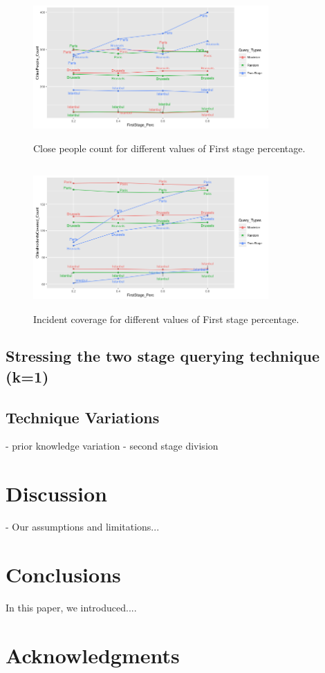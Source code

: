 \documentclass{acm_proc_article-sp}
\begin{document}
\begin{figure}[!h]
\centering
   \includegraphics[width=9cm ,height=5.5cm]{figuresPng/hollaCloseCnt.png}
   \caption{Close people count for different values of First stage percentage. }
   \label{fig: hollaCloseCount}
\end{figure}
\begin{figure}[!h]
\centering
   \includegraphics[width=9cm ,height=5.5cm]{figuresPng/citiesInc.png}
   \caption{Incident coverage for different values of First stage percentage. }
   \label{fig: hollaIncCoverage}
\end{figure}


\subsection{Stressing the two stage querying technique (k=1)}
\subsection{Technique Variations}
- prior knowledge variation
- second stage division
\section{Discussion}
- Our assumptions and limitations...

\section{Conclusions}
In this paper, we introduced.... 

\section{Acknowledgments}


{\footnotesize
}  %
%
%
\end{document}
